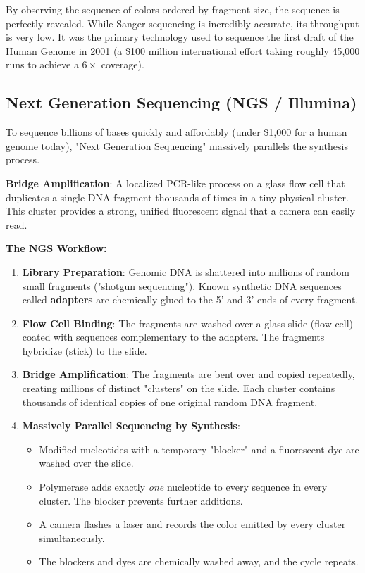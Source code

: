 \documentclass[11pt, a4paper]{article}
\begin{document}
By observing the sequence of colors ordered by fragment size, the sequence is perfectly revealed. While Sanger sequencing is incredibly accurate, its throughput is very low. It was the primary technology used to sequence the first draft of the Human Genome in 2001 (a \$100 million international effort taking roughly 45,000 runs to achieve a \(6\times\) coverage).


\subsection{Next Generation Sequencing (NGS / Illumina)}

To sequence billions of bases quickly and affordably (under \$1,000 for a human genome today), "Next Generation Sequencing" massively parallels the synthesis process.

\begin{important}
    \textbf{Bridge Amplification}: A localized PCR-like process on a glass flow cell that duplicates a single DNA fragment thousands of times in a tiny physical cluster. This cluster provides a strong, unified fluorescent signal that a camera can easily read.
\end{important}

\textbf{The NGS Workflow:}
\begin{enumerate}
    \item \textbf{Library Preparation}: Genomic DNA is shattered into millions of random small fragments ("shotgun sequencing"). Known synthetic DNA sequences called \textbf{adapters} are chemically glued to the 5' and 3' ends of every fragment.
    \item \textbf{Flow Cell Binding}: The fragments are washed over a glass slide (flow cell) coated with sequences complementary to the adapters. The fragments hybridize (stick) to the slide.
    \item \textbf{Bridge Amplification}: The fragments are bent over and copied repeatedly, creating millions of distinct "clusters" on the slide. Each cluster contains thousands of identical copies of one original random DNA fragment.
    \item \textbf{Massively Parallel Sequencing by Synthesis}: 
    \begin{itemize}
        \item Modified nucleotides with a temporary "blocker" and a fluorescent dye are washed over the slide.
        \item Polymerase adds exactly \textit{one} nucleotide to every sequence in every cluster. The blocker prevents further additions.
        \item A camera flashes a laser and records the color emitted by every cluster simultaneously.
        \item The blockers and dyes are chemically washed away, and the cycle repeats.
    \end{itemize}
\end{enumerate}
\end{document}
